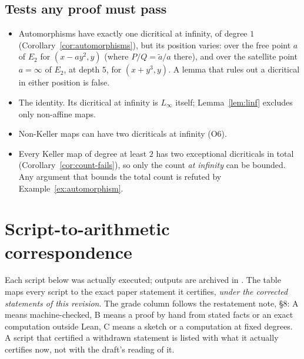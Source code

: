 \documentclass[a4paper,11pt]{article}
\newcommand{\filename}[1]{\texttt{\seqsplit{#1}}}
\theoremstyle{plain}
\theoremstyle{definition}
\theoremstyle{remark}
\begin{document}
\subsection{Tests any proof must pass}

\begin{itemize}[nosep]
\item[\textbf{T1.}] Automorphisms have exactly one dicritical at infinity, of degree $1$
(Corollary~\ref{cor:automorphisms}), but its position varies: over the free point $a$ of
$E_2$ for $(x - a y^2, y)$ (where $P/Q = \tilde{a}/a$ there), and over the satellite point
$a = \infty$ of $E_2$, at depth $5$, for $(x + y^3, y)$. A lemma that rules out a dicritical
in either position is false.
\item[\textbf{T2.}] The identity. Its dicritical at infinity is $L_\infty$ itself;
Lemma~\ref{lem:linf} excludes only non-affine maps.
\item[\textbf{T3.}] Non-Keller maps can have two dicriticals at infinity (O6).
\item[\textbf{T4.}] Every Keller map of degree at least $2$ has two exceptional dicriticals in
total (Corollary~\ref{cor:count-fails}), so only the count \emph{at infinity} can be
bounded. Any argument that bounds the total count is refuted by Example~\ref{ex:automorphism}.
\end{itemize}

\section{Script-to-arithmetic correspondence}\label{sec:correspondence}

Each script below was actually executed; outputs are archived in \filename{outputs/}. The
table maps every script to the exact paper statement it certifies, \emph{under the corrected
statements of this revision}. The grade column follows the restatement note, \S 8: A means
machine-checked, B means a proof by hand from stated facts or an exact computation outside
Lean, C means a sketch or a computation at fixed degrees. A script that certified a withdrawn
statement is listed with what it actually certifies now, not with the draft's reading of it.
\end{document}
